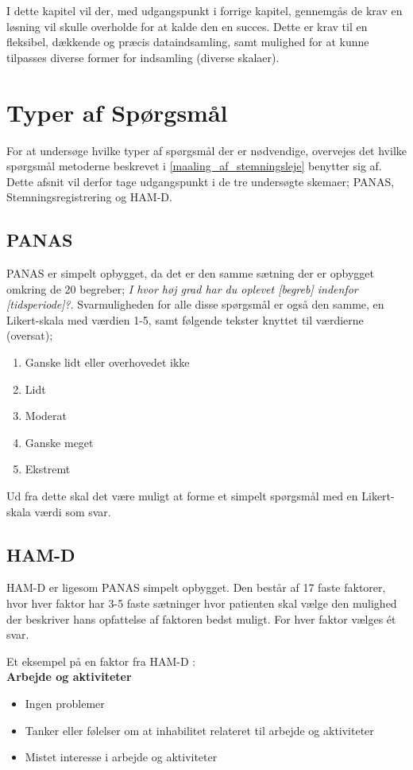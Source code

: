 I dette kapitel vil der, med udgangspunkt i forrige kapitel, gennemgås de krav en løsning vil skulle overholde for at kalde den en succes.
Dette er krav til en fleksibel, dækkende og præcis dataindsamling, samt mulighed for at kunne tilpasses diverse former for indsamling (diverse skalaer).

\section{Typer af Spørgsmål}
For at undersøge hvilke typer af spørgsmål der er nødvendige, overvejes det hvilke spørgsmål metoderne beskrevet i \cref{maaling_af_stemningsleje} benytter sig af.
Dette afsnit vil derfor tage udgangspunkt i de tre undersøgte skemaer; PANAS, Stemningsregistrering og HAM-D.

\subsection{PANAS} 
PANAS er simpelt opbygget, da det er den samme sætning der er opbygget omkring de 20 begreber; \textit{I hvor høj grad har du oplevet [begreb] indenfor [tidsperiode]?}.
Svarmuligheden for alle disse spørgsmål er også den samme, en Likert-skala\cite{likert} med værdien 1-5, samt følgende tekster knyttet til værdierne (oversat);
\begin{enumerate}
\item Ganske lidt eller overhovedet ikke
\item Lidt
\item Moderat
\item Ganske meget
\item Ekstremt
\end{enumerate}

Ud fra dette skal det være muligt at forme et simpelt spørgsmål med en Likert-skala værdi som svar.

\subsection{HAM-D} 
HAM-D er ligesom PANAS simpelt opbygget.
Den består af 17 faste faktorer, hvor hver faktor har 3-5 faste sætninger hvor patienten skal vælge den mulighed der beskriver hans opfattelse af faktoren bedst muligt.
For hver faktor vælges ét svar.

Et eksempel på en faktor fra HAM-D \cite{ham_d}:\\

\textbf{Arbejde og aktiviteter}
\begin{itemize}
\item Ingen problemer
\item Tanker eller følelser om at inhabilitet relateret til arbejde og aktiviteter
\item Mistet interesse i arbejde og aktiviteter 
\end{itemize}

